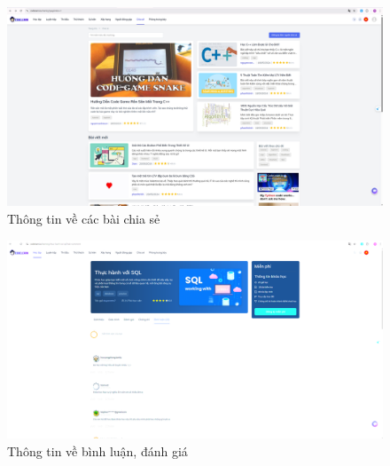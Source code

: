\begin{figure}
    \centering
    \includegraphics[width=1\linewidth]{picture/minh_chung_6.png}
    \caption{Thông tin về các bài chia sẻ}
\end{figure}

\begin{figure}[!htp]
    \centering
    \includegraphics[width=1\linewidth]{picture/minh_chung_5.png}
    \caption{Thông tin về bình luận, đánh giá}
\end{figure}